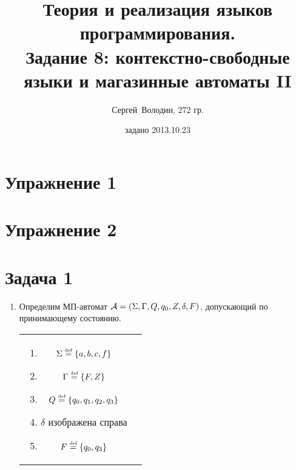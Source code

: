 \documentclass[a4paper]{article}
\title{Теория и реализация языков программирования.\\Задание 8: контекстно-свободные языки и магазинные автоматы II}
\date{задано 2013.10.23}
\author{Сергей~Володин, 272 гр.}
\def\A{{\cal A}}
\def\eqdef{\overset{\mbox{\tiny def}}{=}}
\begin{document}
\maketitle
\section*{Упражнение 1}
\section*{Упражнение 2}
\section*{Задача 1}
\begin{enumerate}
\item Определим МП-автомат $\A=(\Sigma,\Gamma,Q,q_0,Z,\delta,F)$, допускающий по принимающему состоянию.\newline
\begin{tabular}{cc}
\begin{minipage}{0.4\textwidth}
\begin{enumerate}
\item $\Sigma\eqdef\{a,b,c,f\}$
\item $\Gamma\eqdef\{F,Z\}$
\item $Q\eqdef\{q_0,q_1,q_2,q_3\}$
\item $\delta$ изображена справа
\item $F\eqdef\{q_0,q_3\}$
\end{enumerate}
\end{minipage}
&
\begin{minipage}{0.6\textwidth}


\end{minipage}
\end{tabular}
\end{enumerate}
\end{document}
